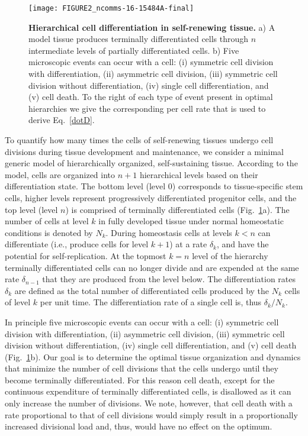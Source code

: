 \documentclass[aps,singlecolumn]{revtex4-1}
\begin{document}
\begin{figure}
\centerline{\texttt{[image: FIGURE2\_ncomms-16-15484A-final]}}
\caption{
{\bf Hierarchical cell differentiation in self-renewing tissue.}
%
a) A model tissue produces terminally differentiated cells through $n$
intermediate levels of partially differentiated cells.
b) Five microscopic events can occur with a cell:
(i) symmetric cell division with differentiation, (ii) asymmetric cell
division, (iii) symmetric cell division without differentiation, (iv)
single cell differentiation, and (v) cell death.
To the
right of each type of event present in optimal hierarchies we give the corresponding per cell rate
that is used to derive Eq.~\ref{dotD}.
}
\label{fig2}
\end{figure}


To quantify how many times the cells of self-renewing
tissues undergo cell divisions during tissue development and maintenance,
we consider a minimal generic model of hierarchically organized,
self-sustaining tissue. According to the model, cells are organized into $n+1$
hierarchical levels based on their differentiation state.
The bottom level (level $0$) corresponds to tissue-specific stem cells,
higher levels represent
progressively differentiated progenitor cells, and the top level
(level $n$) is comprised of terminally differentiated cells (Fig.~\ref{fig2}a).
The number of cells at level $k$ in fully
developed tissue under normal homeostatic conditions is denoted by $N_k$.
During homeostasis cells at
levels $k<n$ can differentiate (i.e., produce cells for
level $k+1$) at a rate $\delta_k$, and have the potential for
self-replication. At the topmost $k=n$ level of the hierarchy terminally
differentiated cells can no longer divide and are expended at the same
rate $\delta_{n-1}$ that they are produced from the level below.
The differentiation rates
$\delta_k$ are defined as the total number of differentiated
cells produced by the $N_k$ cells of level $k$ per unit time. The
differentiation rate of a single cell is, thus
$\delta_k/N_k$.

In principle five microscopic events can occur with a cell:
(i) symmetric cell division with differentiation,
(ii) asymmetric cell division,
(iii) symmetric cell division without differentiation,
(iv) single cell differentiation,
and (v) cell death (Fig.~\ref{fig2}b).
%
Our goal is to determine the optimal tissue organization and dynamics that
minimize the number of cell divisions that the cells undergo
until they become terminally differentiated. For this reason cell
death, except for the continuous expenditure of terminally
differentiated cells, is disallowed as it can only increase the number of
divisions.
We note, however, that cell death with a rate proportional
to that of cell divisions would simply result in a proportionally
increased divisional load and, thus, would have no effect on the optimum.
\end{document}
